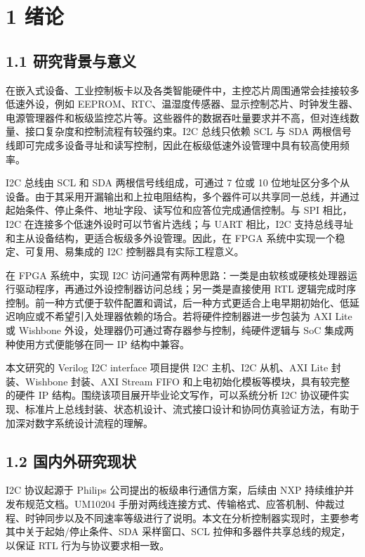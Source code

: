 \section{1 绪论}\label{ux7eeaux8bba}

\subsection{1.1
研究背景与意义}\label{ux7814ux7a76ux80ccux666fux4e0eux610fux4e49}

在嵌入式设备、工业控制板卡以及各类智能硬件中，主控芯片周围通常会挂接较多低速外设，例如
EEPROM、RTC、温湿度传感器、显示控制芯片、时钟发生器、电源管理器件和板级监控芯片等。这些器件的数据吞吐量要求并不高，但对连线数量、接口复杂度和控制流程有较强约束。I2C
总线只依赖 SCL 与 SDA
两根信号线即可完成多设备寻址和读写控制，因此在板级低速外设管理中具有较高使用频率。

I2C 总线由 SCL 和 SDA 两根信号线组成，可通过 7 位或 10
位地址区分多个从设备。由于其采用开漏输出和上拉电阻结构，多个器件可以共享同一总线，并通过起始条件、停止条件、地址字段、读写位和应答位完成通信控制。与
SPI 相比，I2C 在连接多个低速外设时可以节省片选线；与 UART 相比，I2C
支持总线寻址和主从设备结构，更适合板级多外设管理。因此，在 FPGA
系统中实现一个稳定、可复用、易集成的 I2C 控制器具有实际工程意义。

在 FPGA 系统中，实现 I2C
访问通常有两种思路：一类是由软核或硬核处理器运行驱动程序，再通过外设控制器访问总线；另一类是直接使用
RTL
逻辑完成时序控制。前一种方式便于软件配置和调试，后一种方式更适合上电早期初始化、低延迟响应或不希望引入处理器依赖的场合。若将硬件控制器进一步包装为
AXI Lite 或 Wishbone 外设，处理器仍可通过寄存器参与控制，纯硬件逻辑与
SoC 集成两种使用方式便能够在同一 IP 结构中兼容。

本文研究的 Verilog I2C interface 项目提供 I2C 主机、I2C 从机、AXI Lite
封装、Wishbone 封装、AXI Stream FIFO
和上电初始化模板等模块，具有较完整的硬件 IP
结构。围绕该项目展开毕业论文写作，可以系统分析 I2C
协议硬件实现、标准片上总线封装、状态机设计、流式接口设计和协同仿真验证方法，有助于加深对数字系统设计流程的理解。

\subsection{1.2
国内外研究现状}\label{ux56fdux5185ux5916ux7814ux7a76ux73b0ux72b6}

I2C 协议起源于 Philips 公司提出的板级串行通信方案，后续由 NXP
持续维护并发布规范文档。UM10204
手册对两线连接方式、传输格式、应答机制、仲裁过程、时钟同步以及不同速率等级进行了说明。本文在分析控制器实现时，主要参考其中关于起始/停止条件、SDA
采样窗口、SCL 拉伸和多器件共享总线的规定，以保证 RTL
行为与协议要求相一致。

